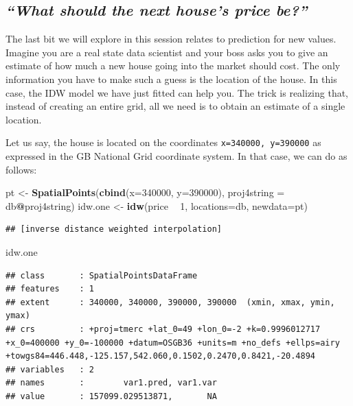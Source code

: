 \documentclass[]{book}
\newenvironment{Shaded}{\begin{snugshade}}{\end{snugshade}}
\newcommand{\DataTypeTok}[1]{\textcolor[rgb]{0.13,0.29,0.53}{#1}}
\newcommand{\DecValTok}[1]{\textcolor[rgb]{0.00,0.00,0.81}{#1}}
\newcommand{\KeywordTok}[1]{\textcolor[rgb]{0.13,0.29,0.53}{\textbf{#1}}}
\newcommand{\NormalTok}[1]{#1}
\newcommand{\OperatorTok}[1]{\textcolor[rgb]{0.81,0.36,0.00}{\textbf{#1}}}
\newcommand{\StringTok}[1]{\textcolor[rgb]{0.31,0.60,0.02}{#1}}
\begin{document}
\hypertarget{what-should-the-next-houses-price-be}{%
\subsection{\texorpdfstring{\emph{``What should the next house's price be?''}}{``What should the next house's price be?''}}\label{what-should-the-next-houses-price-be}}

The last bit we will explore in this session relates to prediction for new values. Imagine you are a real state data scientist and your boss asks you to give an estimate of how much a new house going into the market should cost. The only information you have to make such a guess is the location of the house. In this case, the IDW model we have just fitted can help you. The trick is realizing that, instead of creating an entire grid, all we need is to obtain an estimate of a single location.

Let us say, the house is located on the coordinates \texttt{x=340000,\ y=390000} as expressed in the GB National Grid coordinate system. In that case, we can do as follows:

\begin{Shaded}
\begin{Highlighting}[]
\NormalTok{pt <-}\StringTok{ }\KeywordTok{SpatialPoints}\NormalTok{(}\KeywordTok{cbind}\NormalTok{(}\DataTypeTok{x=}\DecValTok{340000}\NormalTok{, }\DataTypeTok{y=}\DecValTok{390000}\NormalTok{),}
                    \DataTypeTok{proj4string =}\NormalTok{ db}\OperatorTok{@}\NormalTok{proj4string)}
\NormalTok{idw.one <-}\StringTok{ }\KeywordTok{idw}\NormalTok{(price }\OperatorTok{~}\StringTok{ }\DecValTok{1}\NormalTok{, }\DataTypeTok{locations=}\NormalTok{db, }\DataTypeTok{newdata=}\NormalTok{pt)}
\end{Highlighting}
\end{Shaded}

\begin{verbatim}
## [inverse distance weighted interpolation]
\end{verbatim}

\begin{Shaded}
\begin{Highlighting}[]
\NormalTok{idw.one}
\end{Highlighting}
\end{Shaded}

\begin{verbatim}
## class       : SpatialPointsDataFrame 
## features    : 1 
## extent      : 340000, 340000, 390000, 390000  (xmin, xmax, ymin, ymax)
## crs         : +proj=tmerc +lat_0=49 +lon_0=-2 +k=0.9996012717 +x_0=400000 +y_0=-100000 +datum=OSGB36 +units=m +no_defs +ellps=airy +towgs84=446.448,-125.157,542.060,0.1502,0.2470,0.8421,-20.4894 
## variables   : 2
## names       :        var1.pred, var1.var 
## value       : 157099.029513871,       NA
\end{verbatim}
\end{document}
